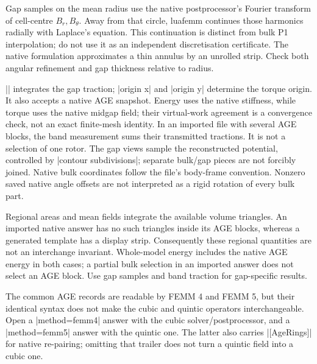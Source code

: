 Gap samples on the mean radius use the native postprocessor's Fourier transform
of cell-centre $B_r,B_\theta$. Away from that circle, luafemm continues those
harmonics radially with Laplace's equation. This continuation is distinct from
bulk P1 interpolation; do not use it as an independent discretisation certificate.
The native formulation approximates a thin annulus by an unrolled strip.
Check both angular refinement and gap thickness relative to radius.

|\femmmeasure[quantity=force,method=band,...]| integrates the gap traction;
|origin x| and |origin y| determine the torque origin. It also accepts a native
AGE snapshot. Energy uses the native stiffness, while torque uses the native
midgap field; their virtual-work agreement is a convergence check, not an exact
finite-mesh identity. In an imported file with several AGE blocks, the band
measurement sums their transmitted tractions. It is not a selection of one rotor.
The gap views sample the reconstructed potential, controlled by
|contour subdivisions|; separate bulk/gap pieces are not forcibly joined.
Native bulk coordinates follow the file's body-frame convention. Nonzero saved
native angle offsets are not interpreted as a rigid rotation of every bulk part.

Regional areas and mean fields integrate the available volume triangles. An
imported native answer has no such triangles inside its AGE blocks, whereas a
generated template has a display strip. Consequently these regional quantities
are not an interchange invariant. Whole-model energy includes the native AGE
energy in both cases; a partial bulk selection in an imported answer does not
select an AGE block. Use gap samples and band traction for gap-specific results.

The common AGE records are readable by FEMM 4 and FEMM 5, but their identical
syntax does not make the cubic and quintic operators interchangeable. Open a
|method=femm4| answer with the cubic solver/postprocessor, and a |method=femm5|
answer with the quintic one. The latter also carries |[AgeRings]| for native
re-pairing; omitting that trailer does not turn a quintic field into a cubic one.
